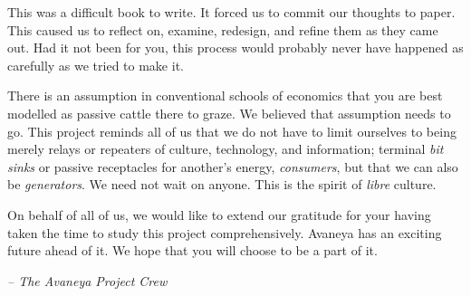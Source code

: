 

This was a difficult book to write. It forced us to commit our thoughts to paper. This caused us to reflect on, examine, redesign, and refine them as they came out. Had it not been for you, this process would probably never have happened as carefully as we tried to make it.

There is an assumption in conventional schools of economics that you are best modelled as passive cattle there to graze. We believed that assumption needs to go. This project reminds all of us that we do not have to limit ourselves to being merely relays or repeaters of culture, technology, and information; terminal {\it bit sinks} or passive receptacles for another's energy, {\it consumers}, but that we can also be {\it generators}. We need not wait on anyone. This is the spirit of {\it libre} culture.

On behalf of all of us, we would like to extend our gratitude for your having taken the time to study this project comprehensively. Avaneya has an exciting future ahead of it. We hope that you will choose to be a part of it. 

\hskip 1.5cm {\it -- The Avaneya Project Crew}

\StopChapter

